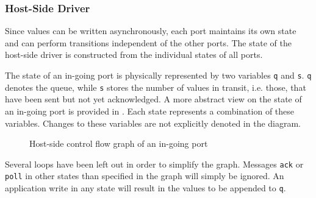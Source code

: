 \documentclass{report}
\begin{document}
\subsubsection{Host-Side Driver}
Since values can be written asynchronously, each port maintains its own state and can perform transitions independent of the other ports. The state of the host-side driver is constructed from the individual states of all ports.

The state of an in-going port is physically represented by two variables \texttt{q} and \texttt{s}. \texttt{q} denotes the queue, while \texttt{s} stores the number of values in transit, i.e. those, that have been sent but not yet acknowledged. A more abstract view on the state of an in-going port is provided in . Each state represents a combination of these variables. Changes to these variables are not explicitly denoted in the diagram.

\begin{figure}[h]
\centering
{}
\label{fig:cfg:hostIn}
\caption{Host-side control flow graph of an in-going port}
\end{figure}

Several loops have been left out in order to simplify the graph. Messages \texttt{ack} or \texttt{poll} in other states than specified in the graph will simply be ignored. An application write in any state will result in the values to be appended to \texttt{q}.
\end{document}
